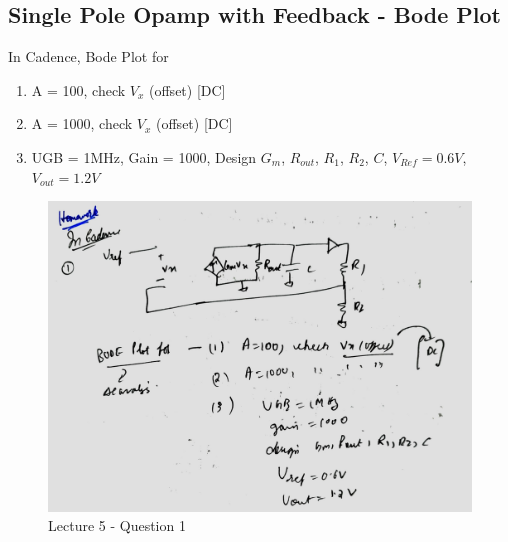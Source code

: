 \documentclass[a4paper]{article}
\begin{document}
\subsection{Single Pole Opamp with Feedback - Bode Plot}
In Cadence, Bode Plot for 
\begin{enumerate}
    \item A = 100, check $V_x$ (offset) [DC]
    \item A = 1000, check $V_x$ (offset) [DC]
    \item UGB = 1MHz, Gain = 1000, Design $G_m$, $R_{out}$, $R_{1}$, $R_{2}$, $C$, $V_{Ref} = 0.6V$, $V_{out} = 1.2V$
\end{enumerate}
\begin{figure}
    \centering
    \includegraphics[width=0.8\linewidth]{images/Lec_5_Q_1.jpeg}
    \caption{Lecture 5 - Question 1}
\end{figure}
\end{document}
